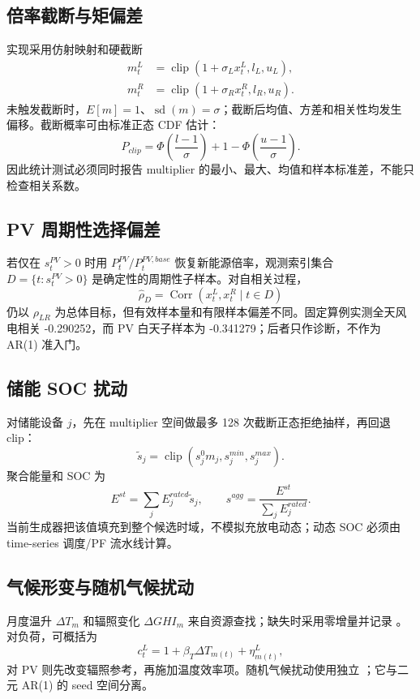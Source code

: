 \subsection{倍率截断与矩偏差}
实现采用仿射映射和硬截断
\begin{align}
 m^L_t&=\operatorname{clip}(1+\sigma_Lx^L_t,l_L,u_L),\\
 m^R_t&=\operatorname{clip}(1+\sigma_Rx^R_t,l_R,u_R).
\end{align}
未触发截断时，$E[m]=1$、$\operatorname{sd}(m)=\sigma$；截断后均值、方差和相关性均发生
偏移。截断概率可由标准正态 CDF 估计：
\begin{equation}
 P_{clip}=\Phi\!\left(\frac{l-1}{\sigma}\right)
 +1-\Phi\!\left(\frac{u-1}{\sigma}\right).
\end{equation}
因此统计测试必须同时报告 multiplier 的最小、最大、均值和样本标准差，不能只检查相关系数。

\subsection{PV 周期性选择偏差}
若仅在 $s^{PV}_t>0$ 时用 $P^{PV}_t/P^{PV,base}_t$ 恢复新能源倍率，观测索引集合
$D=\{t:s^{PV}_t>0\}$ 是确定性的周期性子样本。对自相关过程，
\begin{equation}
 \widehat\rho_D=\operatorname{Corr}(x^L_t,x^R_t\mid t\in D)
\end{equation}
仍以 $\rho_{LR}$ 为总体目标，但有效样本量和有限样本偏差不同。固定算例实测全天风电相关
-0.290252，而 PV 白天子样本为 -0.341279；后者只作诊断，不作为 AR(1) 准入门。

\subsection{储能 SOC 扰动}
对储能设备 $j$，先在 multiplier 空间做最多 128 次截断正态拒绝抽样，再回退 clip：
\begin{equation}
 \widetilde s_j=\operatorname{clip}(s^0_jm_j,s_j^{min},s_j^{max}).
\end{equation}
聚合能量和 SOC 为
\begin{equation}
 E^{st}=\sum_j E_j^{rated}\widetilde s_j,\qquad
 s^{agg}=\frac{E^{st}}{\sum_jE_j^{rated}}.
\end{equation}
当前生成器把该值填充到整个候选时域，不模拟充放电动态；动态 SOC 必须由 time-series
调度/PF 流水线计算。

\subsection{气候形变与随机气候扰动}
月度温升 $\Delta T_m$ 和辐照变化 $\Delta GHI_m$ 来自资源查找；缺失时采用零增量并记录
。对负荷，可概括为
\begin{equation}
 c^L_t=1+\beta_T\Delta T_{m(t)}+\eta^L_{m(t)},
\end{equation}
对 PV 则先改变辐照参考，再施加温度效率项。随机气候扰动使用独立
；它与二元 AR(1) 的 seed 空间分离。

